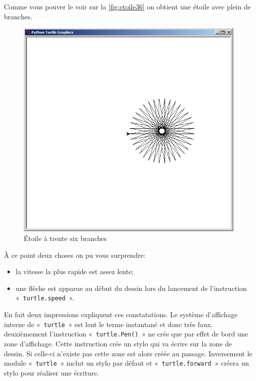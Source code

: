Comme vous pouver le voir sur la \autoref{fig:etoile36} on obtient une étoile avec plein de branches.
\begin{figure}[h!]
\centering
\includegraphics[scale=0.4]{images/etoile36}
\caption{Étoile à trente six branches}\label{fig:etoile36}
\end{figure}

À ce point deux choses on pu vous surprendre:
\begin{itemize}
\item la vitesse la plus rapide est assez lente;
\item une flèche est apparue au début du dessin lors du lancement de l'instruction\\
« \texttt{turtle.speed} ». 
\end{itemize}

En fait deux impressions expliquent ces constatations. Le système d'affichage interne de « \texttt{turtle} » est lent le terme instantané et donc très faux. deuxièmement l'instruction « \texttt{turtle.Pen()} » ne crée que par effet de bord une zone d'affichage. Cette instruction crée un stylo qui va écrire sur la zone de dessin. Si celle-ci n'existe pas cette zone est alors créée au passage. Inversement le module « \texttt{turtle} » inclut un stylo par défaut et « \texttt{turtle.forward} » créera un stylo pour réaliser une écriture.

